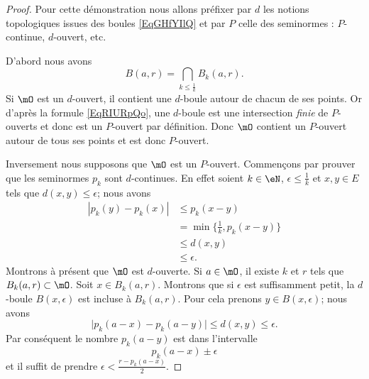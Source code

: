 \begin{proof}
	Pour cette démonstration nous allons préfixer par \( d\) les notions topologiques issues des boules \eqref{EqGHfYIlQ} et par \( P\) celle des seminormes : \( P\)-continue, \( d\)-ouvert, etc.

	D'abord nous avons
	\begin{equation}    \label{EqRIURpQo}
		B(a,r)=\bigcap_{k\leq \frac{1}{ k }}B_k(a,r).
	\end{equation}
	Si \( \mO\) est un \( d\)-ouvert, il contient une \( d\)-boule autour de chacun de ses points. Or d'après la formule \eqref{EqRIURpQo}, une \( d\)-boule est une intersection \emph{finie} de \( P\)-ouverts et donc est un \( P\)-ouvert par définition. Donc \( \mO\) contient un \( P\)-ouvert autour de tous ses points et est donc \( P\)-ouvert.

	Inversement nous supposons que \( \mO\) est un \( P\)-ouvert. Commençons par prouver que les seminormes \( p_k\) sont \( d\)-continues. En effet soient \( k\in \eN\), \( \epsilon\leq \frac{1}{ k }\) et \( x,y\in E\) tels que \( d(x,y)\leq \epsilon\); nous avons
	\begin{subequations}
		\begin{align}
			| p_k(y)-p_k(x) | & \leq p_k(x-y)                     \\
			                  & =\min\{ \frac{1}{ k },p_k(x-y) \} \\
			                  & \leq d(x,y)                       \\
			                  & \leq \epsilon.
		\end{align}
	\end{subequations}
	Montrons à présent que \( \mO\) est \( d\)-ouverte. Si \( a\in\mO\), il existe \( k\) et \( r\) tels que \( B_k(a,r)\subset\mO\). Soit \( x\in B_k(a,r)\). Montrons que si \( \epsilon\) est suffisamment petit, la \( d\)-boule \( B(x,\epsilon)\) est incluse à \( B_k(a,r)\). Pour cela prenons \( y\in B(x,\epsilon)\); nous avons
	\begin{equation}
		\big| p_k(a-x)-p_k(a-y) \big|\leq d(x,y)\leq \epsilon.
	\end{equation}
	Par conséquent le nombre \( p_k(a-y)\) est dans l'intervalle
	\begin{equation}
		p_k(a-x)\pm\epsilon
	\end{equation}
	et il suffit de prendre \( \epsilon<\frac{ r-p_k(a-x) }{2}\).
\end{proof}


